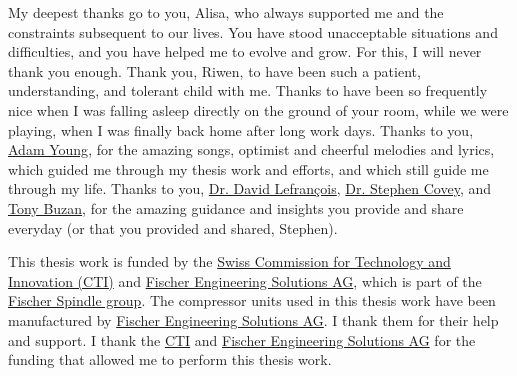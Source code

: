 My deepest thanks go to you, Alisa, who always supported me and the
constraints subsequent to our lives. You have stood unacceptable
situations and difficulties, and you have helped me to evolve and
grow. For this, I will never thank you enough. Thank you, Riwen, to
have been such a patient, understanding, and tolerant child with
me. Thanks to have been so frequently nice when I was falling asleep
directly on the ground of your room, while we were playing, when I was
finally back home after long work days. Thanks to you,
\href{https://en.wikipedia.org/wiki/Adam_Young}{Adam Young}, for the
amazing songs, optimist and cheerful melodies and lyrics, which guided
me through my thesis work and efforts, and which still guide me
through my life. Thanks to you,
\href{https://www.youtube.com/playlist?list=PLIB0FUzmhLoSCRLM2WFt_mz6plvulw6hU}{Dr. David
  Lefrançois},
\href{https://en.wikipedia.org/wiki/Stephen_Covey}{Dr. Stephen Covey},
and \href{https://en.wikipedia.org/wiki/Tony_Buzan}{Tony Buzan}, for
the amazing guidance and insights you provide and share everyday (or
that you provided and shared, Stephen).

This thesis work is funded by the
\href{https://www.kti.admin.ch/kti/en/home.html}{Swiss Commission for
  Technology and Innovation (CTI)} and
\href{http://www.fischerspindle.com/facilities/fischer-engineering-solutions-ag/}{Fischer
  Engineering Solutions AG}, which is part of the \href{http://www.fischerspindle.com/about-us/brands/}{Fischer
  Spindle group}. The compressor units used in this thesis work have
been manufactured by
\href{http://www.fischerspindle.com/facilities/fischer-engineering-solutions-ag/}{Fischer
  Engineering Solutions AG}. I thank them for their help and
support. I thank the
\href{https://www.kti.admin.ch/kti/en/home.html}{CTI} and
\href{http://www.fischerspindle.com/facilities/fischer-engineering-solutions-ag/}{Fischer
  Engineering Solutions AG} for the funding that allowed me to perform
this thesis work.
